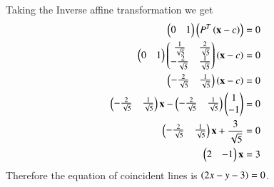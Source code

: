 Taking the Inverse affine transformation we get
\begin{align}
    \begin{pmatrix}0&1\end{pmatrix}\left(P^T\left(\mathbf{x}-c\right)\right)=0\\
    \begin{pmatrix}0&1\end{pmatrix}\begin{pmatrix}\frac{1}{\sqrt{5}}&\frac{2}{\sqrt{5}}\\-\frac{2}{\sqrt{5}}&\frac{1}{\sqrt{5}}\end{pmatrix}\left(\mathbf{x}-c\right)=0\\
    \begin{pmatrix}-\frac{2}{\sqrt{5}}&\frac{1}{\sqrt{5}}\end{pmatrix}\left(\mathbf{x}-c\right)=0\\
    \begin{pmatrix}-\frac{2}{\sqrt{5}}&\frac{1}{\sqrt{5}}\end{pmatrix}\mathbf{x}-\begin{pmatrix}-\frac{2}{\sqrt{5}}&\frac{1}{\sqrt{5}}\end{pmatrix}\begin{pmatrix}1\\-1\end{pmatrix}=0\\
    \begin{pmatrix}-\frac{2}{\sqrt{5}}&\frac{1}{\sqrt{5}}\end{pmatrix}\mathbf{x}+\frac{3}{\sqrt{5}}=0\\
    \begin{pmatrix}2&-1\end{pmatrix}\mathbf{x}=3
\end{align}
Therefore the equation of coincident lines is $\left(2x-y-3\right)=0$.
